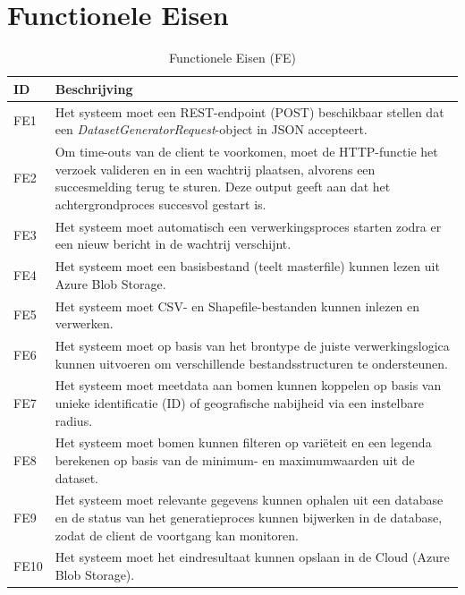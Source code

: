 \section{Functionele Eisen}
\begin{table}[H]
    \centering
    \caption{Functionele Eisen (FE)}
    \label{tab:functionele_eisen}
    \begin{tabular}{|l|p{15cm}|}
        \hline
        \textbf{ID} & \textbf{Beschrijving} \\ \hline
        FE1 & Het systeem moet een REST-endpoint (POST) beschikbaar stellen dat een \textit{DatasetGeneratorRequest}-object in JSON accepteert. \\ \hline
        FE2 & Om time-outs van de client te voorkomen, moet de HTTP-functie het verzoek valideren en in een wachtrij plaatsen, alvorens een succesmelding terug te sturen. Deze output geeft aan dat het achtergrondproces succesvol gestart is. \\ \hline
        FE3 & Het systeem moet automatisch een verwerkingsproces starten zodra er een nieuw bericht in de wachtrij verschijnt. \\ \hline
        FE4 & Het systeem moet een basisbestand (teelt masterfile) kunnen lezen uit Azure Blob Storage.  \\ \hline
        FE5 & Het systeem moet CSV- en Shapefile-bestanden kunnen inlezen en verwerken. \\ \hline
        FE6 & Het systeem moet op basis van het brontype de juiste verwerkingslogica kunnen uitvoeren om verschillende bestandsstructuren te ondersteunen. \\ \hline
        FE7 & Het systeem moet meetdata aan bomen kunnen koppelen op basis van unieke identificatie (ID) of geografische nabijheid via een instelbare radius. \\ \hline
        FE8 & Het systeem moet bomen kunnen filteren op variëteit en een legenda berekenen op basis van de minimum- en maximumwaarden uit de dataset. \\ \hline
        FE9 & Het systeem moet relevante gegevens kunnen ophalen uit een database en de status van het generatieproces kunnen bijwerken in de database, zodat de client de voortgang kan monitoren. \\ \hline
        FE10 & Het systeem moet het eindresultaat kunnen opslaan in de Cloud (Azure Blob Storage). \\ \hline
    \end{tabular}
\end{table}

